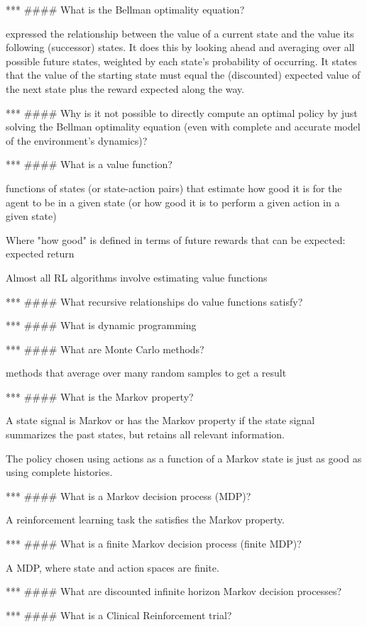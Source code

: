 \documentclass[10pt]{article}
\begin{document}
***
#### What is the Bellman optimality equation?

expressed the relationship between the value of a current state and the value its following (successor) states. It does this by looking ahead and averaging over all possible future states, weighted by each state's probability of occurring. 
It states that the value of the starting state must equal the (discounted) expected value of the next state plus the reward expected along the way.

***
#### Why is it not possible to directly compute an optimal policy by just solving the Bellman optimality equation (even with complete and accurate model of the environment's dynamics)?

***
#### What is a value function?

functions of states (or state-action pairs) that estimate how good it is for the agent to be in a given state (or how good it is to perform a given action in a given state)

Where "how good" is defined in terms of future rewards that can be expected: expected return

Almost all RL algorithms involve estimating value functions

***
#### What recursive relationships do value functions satisfy?


***
#### What is dynamic programming

***
#### What are Monte Carlo methods?

methods that average over many random samples to get a result


***
#### What is the Markov property?

A state signal is Markov or has the Markov property if the state signal summarizes the past states, but retains all relevant information. 

The policy chosen using actions as a function of a Markov state is just as good as using complete histories.

***
#### What is a Markov decision process (MDP)?

A reinforcement learning task the satisfies the Markov property.   

***
#### What is a finite Markov decision process (finite MDP)?

A MDP, where state and action spaces are finite.

***
#### What are discounted infinite horizon Markov decision processes?

***
#### What is a Clinical Reinforcement trial?
\end{document}
